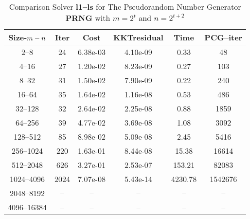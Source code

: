 \documentclass[letterpaper,12pt,oneside,final]{book}
\begin{document}
\begin{table}
\caption{Comparison Solver  {\bf l1--ls} for  The  Pseudorandom Number Generator {\bf PRNG} with $m=2^{t}$ and $n=2^{t+2}$} 
\begin{center}
\begin{tabular}{|*{6}{c}|} \hline
Size-$m\--n$ & \multicolumn{1}{c}{Iter} & \multicolumn{1}{c}{Cost}& \multicolumn{1}{c}{KKTresidual} & \multicolumn{1}{c}{Time} & \multicolumn{1}{c|}{PCG--iter} \\ 
\hline
2--8             &24     &6.38e-03  &4.10e-09  &0.33   &48    \\
4--16            &27     &1.20e-02  &8.23e-09  &0.27   &103   \\
8--32            &31     &1.50e-02  &7.90e-09  &0.22   &240   \\
16--64           &35     &1.64e-02  &1.16e-08  &0.53   &486   \\
32--128          &32     &2.64e-02  &2.25e-08  &0.88   &1859  \\
64--256          &39     &4.77e-02  &3.69e-08  &1.08   &3092  \\
128--512         &85     &8.98e-02  &5.09e-08  &2.45   &5416  \\
256--1024        &220    &1.63e-01  &8.44e-08  &15.38  &16614 \\
512--2048        &626    &3.27e-01  &2.53e-07  &153.21  &82083 \\
1024--4096       &2024   &7.07e-08  &5.43e-14 &4230.78 &1542676\\
2048--8192     &--    &--        &--       &--          &--  \\ 
4096--16384    &--    &--        &--        &--         &-- \\
\hline
\end{tabular}
\end{center}
\end{table}
\end{document}
